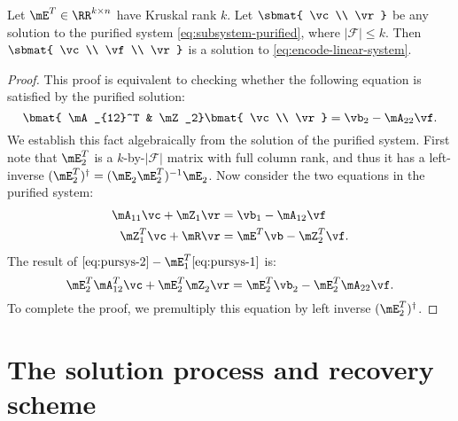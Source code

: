 \documentclass[11pt]{article}
\newcommand{\sF}{{\mathcal{F}}}
\begin{document}
\begin{proposition} \label{prop:equivalence-encode-system-subsystem}
Let $\mE^T \in \RR^{k \times n}$ have Kruskal rank $k$. Let $\sbmat{ \vc \\ \vr}$
be any solution to the purified system \eqref{eq:subsystem-purified},
where $|\sF| \le k$. Then $\sbmat{ \vc\\ \vf \\ \vr}$ is a solution to
\eqref{eq:encode-linear-system}.
\end{proposition}
\begin{proof}
This proof is equivalent to checking whether the following equation is satisfied by
the purified solution:
\begin{equation}
\bmat{ \mA_{12}^T & \mZ_2} \bmat{ \vc \\ \vr} = \vb_2 - \mA_{22} \vf.
\end{equation}
We establish this fact algebraically from the solution of the purified system.
First note that $\mE_2^T$ is a $k$-by-$|\sF|$ matrix with full column rank,
and thus it has a left-inverse $(\mE_2^T)^{\dagger} = (\mE_2^{} \mE_2^T)^{-1} \mE_2^{}$.
Now consider the two equations in the purified system: 
\begin{align}
\label{eq:pursys-1} \mA_{11} \vc + \mZ_1 \vr & = \vb_1 - \mA_{12} \vf \\
\label{eq:pursys-2} \mZ_1^T \vc + \mR \vr & = \mE_{}^T \vb - \mZ_2^T \vf.
\end{align}
The result of $\text{\eqref{eq:pursys-2}} - \mE_1^T \text{\eqref{eq:pursys-1}}$ is: 
\[ \mE_2^T \mA_{12}^T \vc + \mE_2^T \mZ_2^{} \vr = \mE_2^T \vb_2^{} - \mE_2^T \mA_{22} \vf. \]
To complete the proof, we premultiply this equation by left inverse $(\mE_2^T)^{\dagger}$.
\end{proof}

\section{The solution process and recovery scheme}
\label{section:solution-process-and-recovery-scheme}
\end{document}
